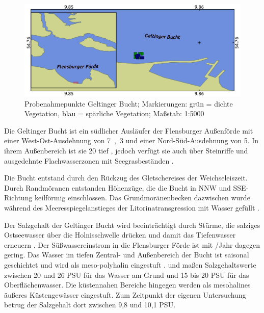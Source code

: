 \begin{figure}[htb]
\centering
\includegraphics[width=1\textwidth]{images/GB.png}
\caption[Probenahmepunkte Geltinger Bucht]{Probenahmepunkte Geltinger Bucht; Markierungen: grün = dichte Vegetation, blau = spärliche Vegetation; Maßstab: 1:5000}
\label{GB}
\end{figure}


Die Geltinger Bucht ist ein südlicher Ausläufer der Flensburger Außenförde mit einer West-Ost-Ausdehnung von \unit{7,3}{\kilo\metre} und einer Nord-Süd-Ausdehnung von \unit{5}{\kilo\metre}. In ihrem Außenbereich ist sie \unit{20}{\metre} tief \citep{nikulina_2009}, jedoch verfügt sie auch über Steinriffe und ausgedehnte Flachwasserzonen mit Seegrasbeständen   \citep{landesbetrieb_fur_kustenschutz_nationalpark_und_meeresschutz_schleswig-holstein_2013}.

Die Bucht entstand durch den Rückzug des Gletschereises der Weichseleiszeit. Durch Randmöranen entstanden Höhenzüge, die die Bucht in NNW und SSE-Richtung keilförmig einschlossen. Das Grundmoränenbecken dazwischen wurde während des Meeresspiegelanstieges der Litorinatransgression mit Wasser gefüllt \citep{reisch_1997}.

Der Salzgehalt der Geltinger Bucht wird beeinträchtigt durch Stürme, die salziges Ostseewasser über die Holnisschwelle drücken und damit das Tiefenwasser erneuern \citep{nikulina_2009}. Der Süßwassereinstrom  in die Flensburger Förde ist mit \unit{}{\kilo\cubic\metre}/Jahr \citep{lanu_2001} dagegen gering.
Das Wasser im tiefen Zentral- und Außenbereich der Bucht ist saisonal geschichtet und wird als meso-polyhalin eingestuft \citep{reimers_2005}. \cite{kandler_1963,exon_1972} und \cite{bluhm_1990} maßen Salzgehaltswerte zwischen 20 und 26 PSU für das Wasser am Grund und 15 bis 20 PSU für das Oberflächenwasser. Die küstennahen Bereiche hingegen werden als mesohalines äußeres Küstengewässer eingestuft. Zum Zeitpunkt der eigenen Untersuchung betrug der Salzgehalt dort zwischen 9,8 und 10,1 PSU.

